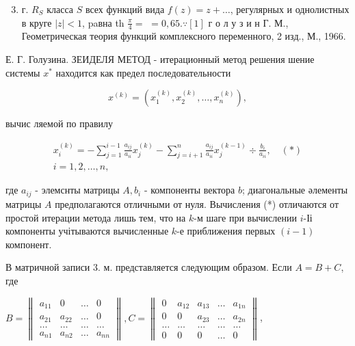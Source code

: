 \documentclass[10pt]{article}
\begin{document}
\begin{enumerate}

  \setcounter{enumi}{2}

  \item г. $R_{S}$ класса $S$ всех функций вида $f(z)=z+\ldots$, регулярных и однолистных в круге $|z|<1$, paвна th $\frac{\pi}{4}=$ $=0,65 . \because[1]$ г о л у з и н Г. М., Геометрическая теория функций комплексного переменного, 2 изд., М., 1966.

\end{enumerate}



Е. Г. Голузина. ЗЕИДЕЛЯ МЕТОД - итерационный метод решения шение системы $x^{*}$ находится как предел последовательности



\[

x^{(k)}=\left(x_{1}^{(k)}, x_{2}^{(k)}, \ldots, x_{n}^{(k)}\right),

\]



вычис ляемой по правилу



\[

\begin{gathered}

x_{i}^{(k)}=-\sum_{j=1}^{i-1} \frac{a_{i j}}{a_{i i}} x_{j}^{(k)}-\sum_{j=i+1}^{n} \frac{a_{i j}}{a_{i i}} x_{j}^{(k-1)} \div \frac{b_{i}}{a_{i i}}, \quad(*) \\

i=1,2, \ldots, n,

\end{gathered}

\]



где $a_{i j}$ - элемснты матрицы $A, b_{i}$ - компоненты вектора $b$; диагональные әлементы матрицы $A$ предполагаются отличными от нуля. Вычисления (*) отличаются от простой итерации метода лишь тем, что на $k$-м шаге при вычислении $i$-Іі компоненты учітываются вычисленные $k$-е приближения первых $(i-1)$ компонент.



В матричной записи 3. м. представляется следующим образом. Если $A=B+C$, где



$B=\left\|\begin{array}{llll}a_{11} & 0 & \ldots & 0 \\ a_{21} & a_{22} & \ldots & 0 \\ \ldots & \ldots & \ldots & \ldots \\ a_{n 1} & a_{n 2} & \ldots & a_{n n}\end{array}\right\|, C=\left\|\begin{array}{ccccc}0 & a_{12} & a_{13} & \ldots & a_{1 n} \\ 0 & 0 & a_{23} & \ldots & a_{2 n} \\ \ldots & \ldots & \ldots & \ldots & \ldots \\ 0 & 0 & 0 & \ldots & 0\end{array}\right\|$,
\end{document}
